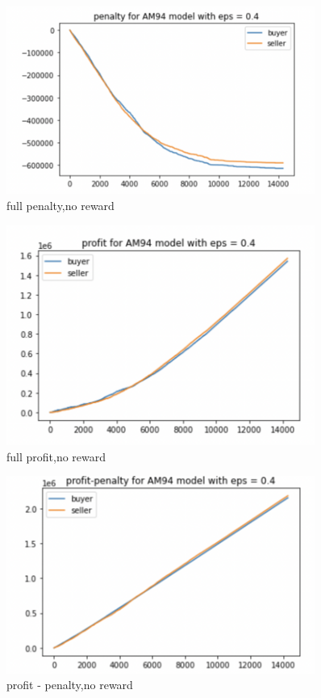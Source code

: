\documentclass[11pt]{article}
\begin{document}
\begin{figure}[H]
	\begin{center}
	\includegraphics[width=0.9\textwidth]{25.PNG}
	\end{center}
	\caption{full penalty,no reward}
	\label{FIG.25}
\end{figure}

\begin{figure}[H]
	\begin{center}
	\includegraphics[width=0.9\textwidth]{26.PNG}
	\end{center}
	\caption{full profit,no reward}
	\label{FIG.26}
\end{figure}

\begin{figure}[H]
	\begin{center}
	\includegraphics[width=0.9\textwidth]{27.PNG}
	\end{center}
	\caption{profit - penalty,no reward}
	\label{FIG.27}
\end{figure}	
\end{document}

